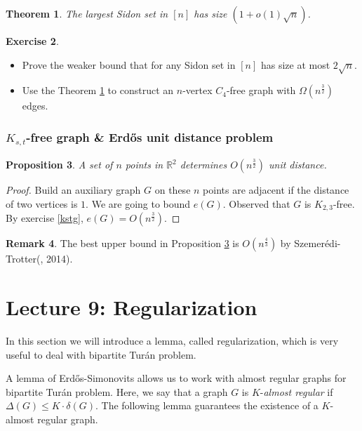\documentclass{article}
\newtheorem{theorem}{Theorem}[section]
\newtheorem{proposition}[theorem]{Proposition}
\theoremstyle{definition}
\newtheorem{remark}[theorem]{Remark}
\newtheorem{exercise}[theorem]{Exercise}
\def\Erdos{Erd\H{o}s}
\def\Turan{Tur\'an}
\begin{document}
\begin{theorem}\label{SS}
    The largest Sidon set in $[n]$ has size $(1+o(1)\sqrt{n})$.
\end{theorem}

\begin{exercise}
\leavevmode
    \begin{itemize}
        \item Prove the weaker bound that for any Sidon set in $[n]$ has size at most $2\sqrt{n}$.
        \item Use the Theorem \ref{SS} to construct an $n$-vertex $C_4$-free graph with $\Omega(n^{\frac{3}{2}})$ edges.
    \end{itemize}
\end{exercise}

\subsubsection{$K_{s,t}$-free graph \& \Erdos{} unit distance problem}
\begin{proposition}\label{pd}
    A set of $n$ points in $\mathbb{R}^2$ determines $O(n^{\frac{3}{2}})$ unit distance.
\end{proposition}
\begin{proof}
    Build an auxiliary graph $G$ on these $n$ points are adjacent if the distance of two vertices is $1$. We are going to bound $e(G)$.
    Observed that $G$ is $K_{2,3}$-free. By exercise \ref{kstg}, $e(G)=O(n^{\frac{3}{2}})$.
 \end{proof}
\begin{remark}
    The best upper bound in Proposition \ref{pd} is $O(n^{\frac{4}{3}})$ by Szemer\'edi-Trotter(\cite{shkredov2015sums}, 2014).
\end{remark}

\newpage
\section{Lecture 9: Regularization}

In this section we will introduce a lemma, called regularization, which is very useful to deal with  bipartite \Turan{} problem.  

A lemma of \Erdos{}-Simonovits allows us to work with almost regular graphs for bipartite \Turan{} problem. Here, we say that a graph $G$ is $K$-\emph{almost regular} if $\Delta(G)\leq K\cdot \delta(G)$. The following lemma guarantees the existence of a $K$-almost regular graph. 
\end{document}
